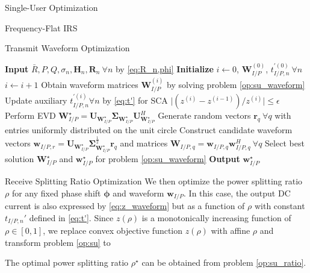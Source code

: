 \documentclass{IEEEtran}
\begin{document}
\begin{section}{Single-User Optimization}
\begin{subsection}{Frequency-Flat IRS}
\begin{subsubsection}{Transmit Waveform Optimization}
			\begin{algorithm}
				\caption{FF-IRS: Transmit Waveform Optimization}
				\label{al:ff_waveform}
				\begin{algorithmic}[1]
					\State \textbf{Input} $\bar{R},P,Q,\sigma_n,\boldsymbol{H}_n,\boldsymbol{R}_n \ \forall n$ by \ref{eq:R_n,phi}
					\State \textbf{Initialize} $i \leftarrow 0$, $\boldsymbol{W}_{I/P}^{(0)}$, $t_{I/P,n}^{\prime (0)} \ \forall n$
					\Repeat
					\State $i \leftarrow i + 1$
					\State Obtain waveform matrices $\boldsymbol{W}_{I/P}^{(i)}$ by solving problem \ref{op:su_waveform}
					\State Update auxiliary $t_{I/P,n}^{\prime (i)} \forall n$ by \ref{eq:t'} for SCA
					\Until $\lvert (z^{(i)}-z^{(i-1)}) / z^{(i)} \rvert \le \epsilon$
					\State Perform EVD $\boldsymbol{W}_{I/P}^{\star}=\boldsymbol{U}_{\boldsymbol{W}_{I/P}^{\star}}\boldsymbol{\Sigma}_{\boldsymbol{W}_{I/P}^{\star}}\boldsymbol{U}_{\boldsymbol{W}_{I/P}^{\star}}^H$
					\State Generate random vectors $\boldsymbol{r}_q \ \forall q$ with entries uniformly distributed on the unit circle
					\State Construct candidate waveform vectors $\boldsymbol{w}_{I/P,r}=\boldsymbol{U}_{\boldsymbol{W}_{I/P}^{\star}}\boldsymbol{\Sigma}_{\boldsymbol{W}_{I/P}^{\star}}^{\frac{1}{2}}\boldsymbol{r}_q$ and matrices $\boldsymbol{W}_{I/P,q}=\boldsymbol{w}_{I/P,q}\boldsymbol{w}_{I/P,q}^H  \ \forall q$
					\State Select best solution $\boldsymbol{W}_{I/P}^\star$ and $\boldsymbol{w}_{I/P}^\star$ for problem \ref{op:su_waveform}
					\State \textbf{Output} $\boldsymbol{w}_{I/P}^\star$
				\end{algorithmic}
			\end{algorithm}
		\end{subsubsection}

		\begin{subsubsection}{Receive Splitting Ratio Optimization}
			We then optimize the power splitting ratio $\rho$ for any fixed phase shift $\boldsymbol{\phi}$ and waveform $\boldsymbol{w}_{I/P}$. In this case, the output DC current is also expressed by \ref{eq:z_waveform} but as a function of $\rho$ with constant $t_{I/P,n}'$ defined in \ref{eq:t'}. Since $z(\rho)$ is a monotonically increasing function of $\rho \in [0, 1]$, we replace convex objective function $z(\rho)$ with affine $\rho$ and transform problem \ref{op:su} to
			\begin{maxi!}
				{\rho}{\rho}{\label{op:su_ratio}}{\label{eq:su_ratio_target}}
			\end{maxi!}
			The optimal power splitting ratio $\rho^\star$ can be obtained from problem \ref{op:su_ratio}.
		\end{subsubsection}


\end{subsection}
\end{section}
\end{document}
